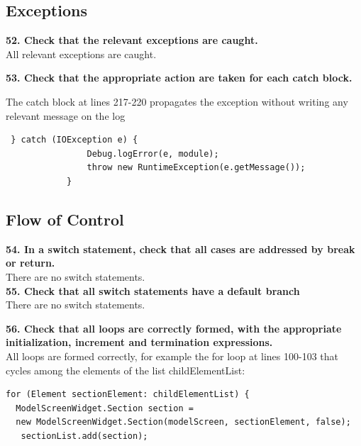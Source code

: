 \documentclass{article}
\begin{document}
\begin{flushleft}
\subsection{Exceptions}

\textbf{52. Check that the relevant exceptions are caught.}\\
\vspace{0.5cm}
All relevant exceptions are caught. \\
\vspace{0.5cm}

\textbf{53. Check that the appropriate action are taken for each catch block.}\\
\vspace{0.5cm}

The catch block at lines 217-220 propagates the exception without writing any relevant message on the log\\
\vspace{0.5cm}
\begin{lstlisting}
 } catch (IOException e) {
                Debug.logError(e, module);
                throw new RuntimeException(e.getMessage());
            }
\end{lstlisting}
\vspace{0.5cm}




\subsection{Flow of Control}
\textbf{54. In a switch statement, check that all cases are addressed by break or return.}\\
\vspace{0.5cm}
There are no switch statements.\\
\vspace{0.5cm}
\textbf{55. Check that all switch statements have a default branch}\\
\vspace{0.5cm}
There are no switch statements.\\
\vspace{0.5cm}

\textbf{56. Check that all loops are correctly formed, with the appropriate initialization, increment and termination expressions.}\\
\vspace{0.5cm}
All loops are formed correctly, for example the for loop at lines 100-103 that cycles among the elements of the list childElementList:\\
\vspace{0.5cm}
 \begin{lstlisting}         
for (Element sectionElement: childElementList) {
  ModelScreenWidget.Section section = 
  new ModelScreenWidget.Section(modelScreen, sectionElement, false);
   sectionList.add(section);
            

\end{lstlisting}
\end{flushleft}
\end{document}
